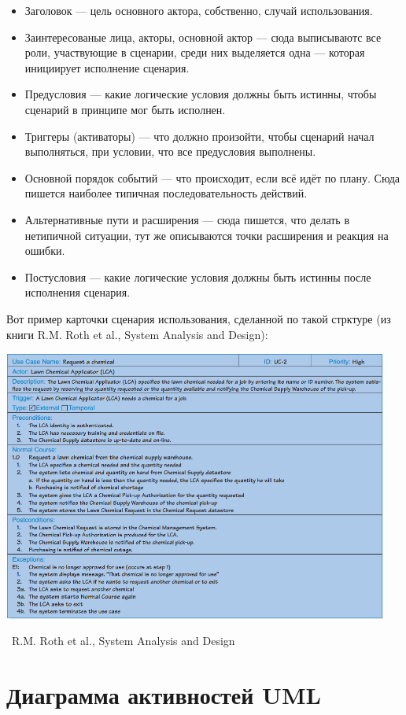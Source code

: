 \documentclass[a5paper]{article}
\newcommand{\attribution}[1] {
	\vspace{-5mm}\begin{flushright}\begin{scriptsize}%
	{\textcopyright\, #1}\end{scriptsize}\end{flushright}
}
\begin{document}
\begin{itemize}
	\item Заголовок --- цель основного актора, собственно, случай использования.
	\item Заинтересованые лица, акторы, основной актор --- сюда выписываютс все роли, участвующие в сценарии, среди них выделяется одна --- которая инициирует исполнение сценария.
	\item Предусловия --- какие логические условия должны быть истинны, чтобы сценарий в принципе мог быть исполнен.
	\item Триггеры (активаторы) --- что должно произойти, чтобы сценарий начал выполняться, при условии, что все предусловия выполнены.
	\item Основной порядок событий --- что происходит, если всё идёт по плану. Сюда пишется наиболее типичная последовательность действий.
	\item Альтернативные пути и расширения --- сюда пишется, что делать в нетипичной ситуации, тут же описываются точки расширения и реакция на ошибки.
	\item Постусловия --- какие логические условия должны быть истинны после исполнения сценария.
\end{itemize}

Вот пример карточки сценария использования, сделанной по такой стрктуре (из книги  R.M. Roth et al., System Analysis and Design):

\begin{center}
	\includegraphics[width=0.95\textwidth]{useCaseExample.png}
	\attribution{R.M. Roth et al., System Analysis and Design}
\end{center}

\section{Диаграмма активностей UML}
\end{document}
